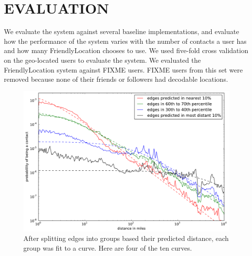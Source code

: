 \ifdefined\THESIS
    \chapter{\uppercase{Evaluation}}
\fi
We evaluate the system against several baseline implementations, and evaluate
how the performance of the system varies with the number of contacts a user has
and how many FriendlyLocation chooses to use.
We used five-fold cross validation on the geo-located users to evaluate the system.
We evaluated the FriendlyLocation system against FIXME users.
FIXME users from this set were removed because none of their friends or
followers had decodable locations.


\begin{figure}[tb]
\centering
\includegraphics[width=\linewidth]{figures/near_prob_fit.pdf}
\caption{
After splitting edges into groups based their predicted distance, each group was fit to a curve. Here are four of the ten curves.
}
\label{fig:NearProbFit}
\end{figure}

